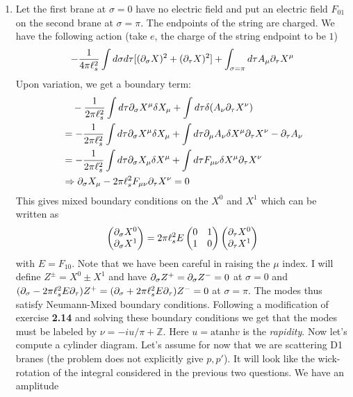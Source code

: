 \documentclass[11pt, class=article, crop=false]{standalone}
\begin{document}
\begin{enumerate}
	\item Let the first brane at $\sigma = 0$ have no electric field and put an electric field $F_{01}$ on the second brane at $\sigma = \pi$. The endpoints of the string are charged. We have the following action (take $e$, the charge of the string endpoint to be $1$)
	\[
		-\frac{1}{4\pi \ell_s^2} \int d\sigma d\tau [(\partial_\sigma X)^2 + (\partial_\tau X)^2] + \int_{\sigma = \pi} d\tau A_\mu \partial_{\tau} X^\mu
	\]
	Upon variation, we get a boundary term:
	\[
	\begin{aligned}
		&\quad -\frac{1}{2\pi \ell_s^2} \int d\tau \partial_\sigma X^\mu \delta X_\mu  + \int d\tau \delta(A_\nu \partial_\tau X^\nu)
		\\
		&= -\frac{1}{2\pi \ell_s^2} \int d\tau \partial_\sigma X^\mu \delta X_\mu  + \int d\tau \partial_\mu A_\nu \delta X^\mu \partial_\tau X^\nu - \partial_\tau A_\nu \\
		&= -\frac{1}{2\pi \ell_s^2} \int d\tau \partial_\sigma X_\mu \delta X^\mu  + \int d\tau F_{\mu \nu} \delta X^\mu \partial_\tau X^\nu\\
		& \Rightarrow \partial_\sigma X_\mu - 2\pi \ell_s^2 F_{\mu \nu} \partial_\tau X^\nu = 0
	\end{aligned}
	\]
	This gives mixed boundary conditions on the $X^0$ and $X^1$ which can be written as
	\[
		\begin{pmatrix}
			\partial_\sigma X^0\\
			\partial_\sigma X^1
		\end{pmatrix}= 2 \pi \ell_s^2 E \begin{pmatrix}
			0 & 1 \\
			1 & 0
		\end{pmatrix}
		\begin{pmatrix}
			\partial_\tau X^0\\
			\partial_\tau X^1
		\end{pmatrix}
	\]
	with $E = F_{10}$.
	Note that we have been careful in raising the $\mu$ index. I will define $Z^{\pm} = X^0 \pm X^1$ and have $\partial_\sigma Z^+ = \partial_\sigma Z^- = 0$ at $\sigma = 0$ and $(\partial_\sigma - 2\pi \ell_s^2 E \partial_\tau) Z^+ = (\partial_\sigma +2\pi \ell_s^2 E \partial_\tau) Z^- = 0 $ at  $\sigma = \pi$. The modes thus satisfy Neumann-Mixed boundary conditions. Following a modification of exercise \textbf{2.14} and solving these boundary conditions we get that the modes must be labeled by $\nu = -i u/\pi + \mathbb Z$. Here $u = \mathrm{atanh}{v}$ is the \emph{rapidity}. Now let's compute a cylinder diagram. Let's assume for now that we are scattering D1 branes (the problem does not explicitly give $p, p'$). It will look like the wick-rotation of the integral considered in the previous two questions. We have an amplitude

\end{enumerate}
\end{document}
